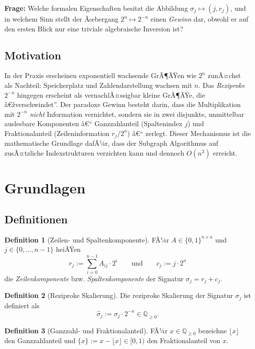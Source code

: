 ﻿\documentclass[a4paper,12pt]{article}
\theoremstyle{definition}
\newtheorem{definition}{Definition}
\begin{document}
\textbf{Frage:} Welche formalen Eigenschaften besitzt die Abbildung
$\sigma_j \mapsto (j, r_j)$, und in welchem Sinn stellt der Ãœbergang
$2^n \mapsto 2^{-n}$ einen \emph{Gewinn} dar, obwohl er auf den ersten Blick
nur eine triviale algebraische Inversion ist?

\subsection{Motivation}

In der Praxis erscheinen exponentiell wachsende GrÃ¶ÃŸen wie $2^n$ zunÃ¤chst
als Nachteil: Speicherplatz und Zahlendarstellung wachsen mit $n$. Das
\emph{Reziproke} $2^{-n}$ hingegen erscheint als vernachlÃ¤ssigbar kleine GrÃ¶ÃŸe,
die â€žverschwindet''. Der paradoxe Gewinn besteht darin, dass die
Multiplikation mit $2^{-n}$ \emph{nicht} Information vernichtet, sondern
sie in zwei disjunkte, unmittelbar auslesbare Komponenten â€“ Ganzzahlanteil
(Spaltenindex $j$) und Fraktionalanteil (Zeileninformation $r_j / 2^n$) â€“
zerlegt. Dieser Mechanismus ist die mathematische Grundlage dafÃ¼r, dass der
Subgraph Algorithmus auf zusÃ¤tzliche Indexstrukturen verzichten kann und
dennoch $O(n^3)$ erreicht.

\section{Grundlagen}

\subsection{Definitionen}

\begin{definition}[Zeilen- und Spaltenkomponente]
	FÃ¼r $A \in \{0,1\}^{n\times n}$ und $j \in \{0,\ldots,n-1\}$ heiÃŸen
	\[
		r_j := \sum_{i=0}^{n-1} A_{ij}\cdot 2^i
		\qquad\text{und}\qquad
		c_j := j \cdot 2^n
	\]
	die \emph{Zeilenkomponente} bzw. \emph{Spaltenkomponente} der Signatur
	$\sigma_j = r_j + c_j$.
\end{definition}

\begin{definition}[Reziproke Skalierung]
	Die reziproke Skalierung der Signatur $\sigma_j$ ist definiert als
	\[
		\hat\sigma_j := \sigma_j \cdot 2^{-n} \in \mathbb{Q}_{\geq 0}.
	\]
\end{definition}

\begin{definition}[Ganzzahl- und Fraktionalanteil]
	FÃ¼r $x \in \mathbb{Q}_{\geq 0}$ bezeichne $\lfloor x \rfloor$ den
	Ganzzahlanteil und $\{x\} := x - \lfloor x \rfloor \in [0,1)$ den
	Fraktionalanteil von $x$.
\end{definition}
\end{document}

